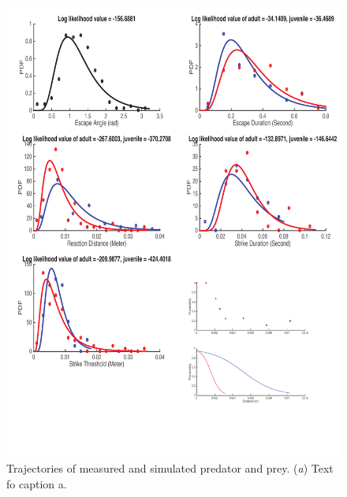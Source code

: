 \documentclass[]{rsos}%
\begin{document}
\begin{figure}[!h]
\centering
	\includegraphics[width=5.5in]{fig_PDFs}
\caption{Trajectories of measured and simulated predator and prey. 
(\textit{a}) Text fo caption a.}
\label{fig_PDF}
\end{figure}

\pagebreak

\pagebreak
\end{document}
